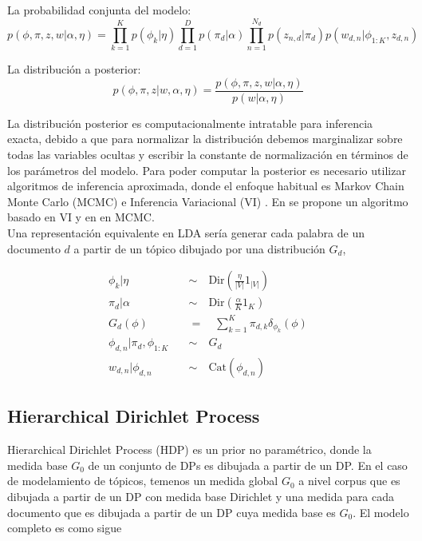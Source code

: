 \documentclass[letterpaper,12pt,oneside]{book} %
\begin{document}
La probabilidad conjunta del modelo:
\begin{equation}
    p(\phi, \pi, z, w|\alpha, \eta)= \prod_{k=1}^{K}p(\phi_{k}|\eta)\prod_{d=1}^{D}p(\pi_{d}|\alpha)\prod_{n=1}^{N_{d}}p(z_{n,d}|\pi_{d})p(w_{d,n}|\phi_{1:K}, z_{d,n})
\end{equation}

La distribución a posterior:
\begin{equation}
    p(\phi, \pi, z|w, \alpha, \eta) = \frac{p(\phi, \pi, z, w|\alpha, \eta)}{p(w|\alpha, \eta)}
\end{equation}

La distribución posterior es computacionalmente intratable para inferencia exacta, debido a que para normalizar la distribución debemos marginalizar sobre todas las variables ocultas y escribir la constante de normalización en términos de los parámetros del modelo. Para poder computar la posterior es necesario utilizar algoritmos de inferencia aproximada, donde el enfoque habitual es Markov Chain Monte Carlo (MCMC) \citep{andrieu2003introduction} e Inferencia Variacional (VI) \citep{blei2017variational}. En \citep{blei2003latent} se propone un algoritmo basado en VI y en \citep{griffiths2004finding} en MCMC.\\

Una representación equivalente en LDA sería generar cada palabra de un documento $d$ a partir de un tópico dibujado por una distribución $G_{d}$,

\begin{align}
    \phi_{k}|\eta \quad & \sim \quad \text{Dir}(\frac{\eta}{|V|}1_{|V|})\\
    \pi_{d}|\alpha \quad & \sim \quad \text{Dir}(\frac{\alpha}{K}1_{K})\\
    G_{d}(\phi)\quad & = \quad \sum_{k=1}^{K}\pi_{d, k}\delta_{\phi_{k}}(\phi)\\
    \phi_{d,n}|\pi_{d}, \phi_{1:K} \quad & \sim \quad G_{d}\\
    w_{d,n}|\phi_{d,n} \quad & \sim \quad  \text{Cat}(\phi_{d,n})
\end{align}

\subsection{Hierarchical Dirichlet Process}
\label{sec:hdp}

Hierarchical Dirichlet Process (HDP)\citep{teh2005sharing} es un prior no paramétrico, donde la medida base $G_{0}$ de un conjunto de DPs es dibujada a partir de un DP. En el caso de modelamiento de tópicos, temenos un medida global $G_{0}$ a nivel corpus que es dibujada a partir de un DP con medida base Dirichlet y una medida para cada documento que es dibujada a partir de un DP cuya medida base es $G_{0}$. El modelo completo es como sigue
\end{document}

